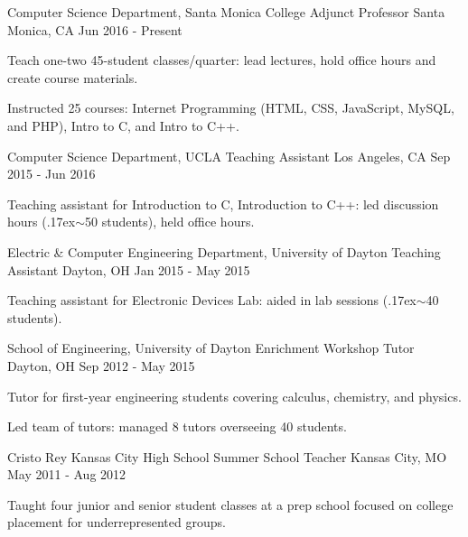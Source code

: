 


\begin{cventries}

\cventry
{Computer Science Department, Santa Monica College}
{Adjunct Professor}
{Santa Monica, CA}
{Jun 2016 - Present}
{
\begin{cvitems}
  \item Teach one-two 45-student classes/quarter: lead lectures, hold office hours and create course materials.
  \item Instructed 25 courses: Internet Programming (HTML, CSS, JavaScript, MySQL, and PHP), Intro to C, and Intro to C++.
\end{cvitems}
}


\cventry
{Computer Science Department, UCLA}
{Teaching Assistant}
{Los Angeles, CA}
{Sep 2015 - Jun 2016}
{
\begin{cvitems}
  \item Teaching assistant for Introduction to C, Introduction to C++: led discussion hours ({\raise.17ex\hbox{$\scriptstyle\sim$}}50 students), held office hours.
\end{cvitems}
}

\cventry
{Electric \& Computer Engineering Department, University of Dayton}
{Teaching Assistant}
{Dayton, OH}
{Jan 2015 - May 2015}
{
\begin{cvitems}
  \item Teaching assistant for Electronic Devices Lab: aided in lab sessions ({\raise.17ex\hbox{$\scriptstyle\sim$}}40 students).
\end{cvitems}
}

\cventry
{School of Engineering, University of Dayton}
{Enrichment Workshop Tutor}
{Dayton, OH}
{Sep 2012 - May 2015}
{
\begin{cvitems}
  \item Tutor for first-year engineering students covering calculus, chemistry, and physics.
  \item Led team of tutors: managed 8 tutors overseeing 40 students.
\end{cvitems}
}


\cventry
{Cristo Rey Kansas City High School}
{Summer School Teacher}
{Kansas City, MO}
{May 2011 - Aug 2012}
{
\begin{cvitems}
\item Taught four junior and senior student classes at a prep school focused on college placement for underrepresented groups.
\end{cvitems}
}

\end{cventries}